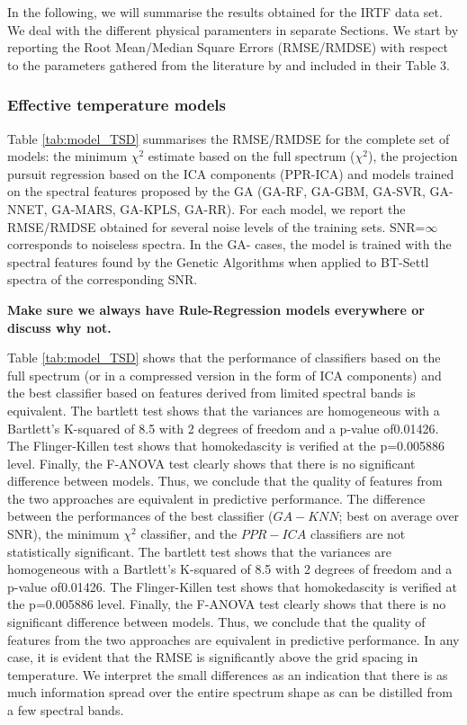 
In the following, we will summarise the results obtained for the IRTF
data set. We deal with the different physical paramenters in separate
Sections. We start by reporting the Root Mean/Median Square Errors
(RMSE/RMDSE) with respect to the parameters gathered from the
literature by \cite{cesetti} and included in their Table 3.

\subsubsection{Effective temperature models}

Table \ref{tab:model_TSD} summarises the RMSE/RMDSE for the complete
set of models: the minimum $\chi^2$ estimate based on the full
spectrum ($\chi^2$), the projection pursuit regression based on the
ICA components (PPR-ICA) and models trained on the spectral features
proposed by the GA (GA-RF, GA-GBM, GA-SVR, GA-NNET, GA-MARS,
GA-KPLS, GA-RR). For each model, we report the RMSE/RMDSE obtained for
several noise levels of the training sets.  SNR=$\infty$ corresponds
to noiseless spectra. In the GA- cases, the model is trained with
  the spectral features found by the Genetic Algorithms when applied
  to BT-Settl spectra of the corresponding SNR.

{\bf Make sure we always have Rule-Regression models everywhere or
  discuss why not.}
  
Table \ref{tab:model_TSD} shows that the performance of classifiers
based on the full spectrum (or in a compressed version in the form of
ICA components) and the best classifier based on features derived from
limited spectral bands is equivalent. The bartlett test shows that the
variances are homogeneous with a Bartlett\textquoteright s K-squared
of 8.5 with 2 degrees of freedom and a p-value of0.01426. The
Flinger-Killen test shows that homokedascity is verified at the
p=0.005886 level. Finally, the F-ANOVA test clearly shows that there
is no significant difference between models. Thus, we conclude that
the quality of features from the two approaches are equivalent in
predictive performance.  The difference between the performances of
the best classifier ($GA-KNN$; best on average over SNR), the minimum
$\chi^2$ classifier, and the $PPR-ICA$ classifiers are not
statistically significant. The bartlett test shows that the variances
are homogeneous with a Bartlett\textquoteright s K-squared of 8.5 with
2 degrees of freedom and a p-value of0.01426. The Flinger-Killen test
shows that homokedascity is verified at the p=0.005886 level. Finally,
the F-ANOVA test clearly shows that there is no significant difference
between models. Thus, we conclude that the quality of features from
the two approaches are equivalent in predictive performance.  In any
case, it is evident that the RMSE is significantly above the grid
spacing in temperature. We interpret the small differences as an
indication that there is as much information spread over the entire
spectrum shape as can be distilled from a few spectral bands.

